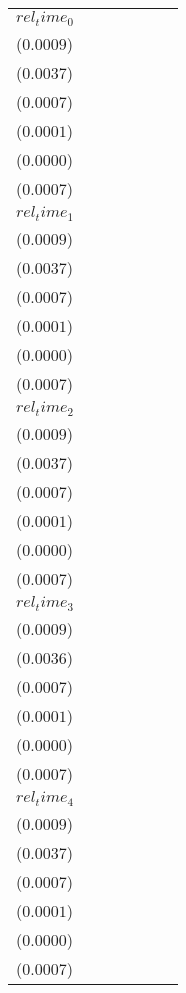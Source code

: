 \begin{tabular}{lllllll}
$rel_time_0$ & \makecell{$0.0015^{*}$ \\ ($0.0009$)} & \makecell{$0.0062^{*}$ \\ ($0.0037$)} & \makecell{$0.0025^{***}$ \\ ($0.0007$)} & \makecell{$0.0002^{***}$ \\ ($0.0001$)} & \makecell{$0.0001^{***}$ \\ ($0.0000$)} & \makecell{$0.0012^{}$ \\ ($0.0007$)} \\
$rel_time_1$ & \makecell{$0.0026^{***}$ \\ ($0.0009$)} & \makecell{$0.0097^{***}$ \\ ($0.0037$)} & \makecell{$0.0027^{***}$ \\ ($0.0007$)} & \makecell{$0.0002^{**}$ \\ ($0.0001$)} & \makecell{$0.0001^{***}$ \\ ($0.0000$)} & \makecell{$0.0021^{***}$ \\ ($0.0007$)} \\
$rel_time_2$ & \makecell{$0.0031^{***}$ \\ ($0.0009$)} & \makecell{$0.0124^{***}$ \\ ($0.0037$)} & \makecell{$0.0018^{***}$ \\ ($0.0007$)} & \makecell{$0.0002^{**}$ \\ ($0.0001$)} & \makecell{$0.0001^{**}$ \\ ($0.0000$)} & \makecell{$0.0029^{***}$ \\ ($0.0007$)} \\
$rel_time_3$ & \makecell{$0.0037^{***}$ \\ ($0.0009$)} & \makecell{$0.0149^{***}$ \\ ($0.0036$)} & \makecell{$0.0002^{}$ \\ ($0.0007$)} & \makecell{$0.0001^{}$ \\ ($0.0001$)} & \makecell{$-0.0000^{}$ \\ ($0.0000$)} & \makecell{$0.0031^{***}$ \\ ($0.0007$)} \\
$rel_time_4$ & \makecell{$0.0026^{***}$ \\ ($0.0009$)} & \makecell{$0.0114^{***}$ \\ ($0.0037$)} & \makecell{$-0.0007^{}$ \\ ($0.0007$)} & \makecell{$-0.0000^{}$ \\ ($0.0001$)} & \makecell{$-0.0001^{**}$ \\ ($0.0000$)} & \makecell{$0.0023^{***}$ \\ ($0.0007$)} \\

\end{tabular}
